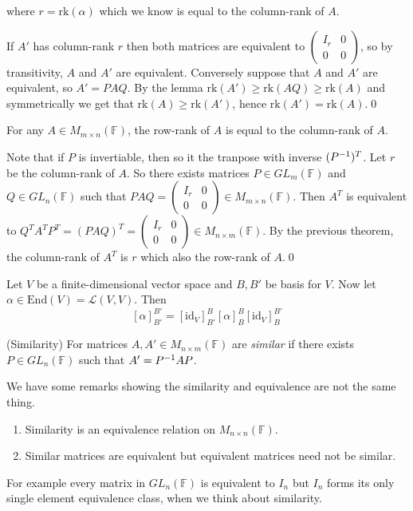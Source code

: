 \documentclass{article}
\newcommand{\F}{\mathbb{F}}
\newcommand{\rk}{\mathrm{rk}}
\begin{document}
where $ r=\rk(\alpha) $ which we know is equal to the column-rank of $ A $.\par
If $ A' $ has column-rank $ r $ then both matrices are equivalent to $ \begin{pmatrix}
	I_r&0\\0 &0
\end{pmatrix} $, so by transitivity, $ A $ and $ A' $ are equivalent. Conversely suppose that $ A $ and $ A' $ are equivalent, so $ A'=PAQ $. By the lemma $ \rk(A')\ge \rk(AQ)\ge\rk(A) $ and symmetrically we get that $ \rk(A)\ge \rk(A') $, hence $ \rk(A')=\rk(A) $.\qed
\begin{theorem}
	For any $ A\in M_{m\times n}(\F) $, the row-rank of $ A $ is equal to the column-rank of $ A $.
\end{theorem}
\pf Note that if $ P $ is invertiable, then so it the tranpose with inverse $ ({P}^{-1})^T $. Let $ r $ be the column-rank of $ A $. So there exists matrices $ P\in GL_m(\F) $ and $ Q\in GL_n(\F) $ such that $ PAQ=\begin{pmatrix}
	I_r&0\\ 0 & 0
\end{pmatrix}\in M_{m\times n}(\F) $. Then $ A^T $ is equivalent to $ Q^TA^TP^T=(PAQ)^T=\begin{pmatrix}
	I_r & 0 \\ 0 & 0
\end{pmatrix} \in M_{n\times m}(\F)$. By the previous theorem, the column-rank of $ A^T $ is $ r $ which also the row-rank of $ A $.\qed\par
Let $ V $ be a finite-dimensional vector space and $ B,B' $ be basis for $ V $. Now let $ \alpha\in\mathrm{End}(V)=\mathcal L(V,V) $. Then
\[
	[\alpha]^{B'}_{B'}=[\mathrm{id}_V]^B_{B'}[\alpha]^B_B[\mathrm{id}_V]^{B'}_B
\]
\begin{definition}
	(Similarity) For matrices $ A,A'\in M_{n\times m}(\F) $ are \textit{similar} if there exists $ P\in GL_n(\F) $ such that $ A'={P}^{-1} AP $.
\end{definition}
\begin{remark}
We have some remarks showing the similarity and equivalence are not the same thing.
\begin{enumerate}
	\item Similarity is an equivalence relation on $ M_{n\times n}(\F) $.
	\item Similar matrices are equivalent but equivalent matrices need not be similar.
\end{enumerate}
For example every matrix in $ GL_n(\F) $ is equivalent to $ I_n $ but $ I_n $ forms its only single element equivalence class, when we think about similarity.
\end{remark}
\end{document}
